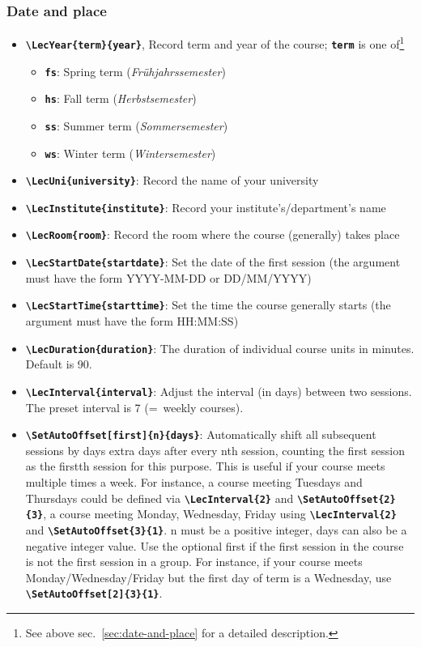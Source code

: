 \documentclass[english]{article}
\newcommand*\jmacro[1]{\textbf{\texttt{#1}}}
\newcommand*\jcsmacro[1]{\jmacro{\textbackslash{#1}}}
\newcommand*\joption[1]{\textbf{\texttt{#1}}}
\newcommand*\jparam[1]{\angus #1\angud}
\begin{document}
\subsubsection{Date and place}
\begin{itemize}
\item \jcsmacro{LecYear\{\jparam{term}\}\{\jparam{year}\}}, Record term and
year of the course; \joption{\jparam{term}} is one of\footnote{See above sec.~\ref{sec:date-and-place} for a detailed
description.}

\begin{itemize}
\item \joption{fs}: Spring term (\emph{Frühjahrssemester})
\item \joption{hs}: Fall term (\emph{Herbstsemester})
\item \joption{ss}: Summer term (\emph{Sommersemester})
\item \joption{ws}: Winter term (\emph{Wintersemester})
\end{itemize}
\item \jcsmacro{LecUni\{\jparam{university}\}}: Record the name of
your university
\item \jcsmacro{LecInstitute\{\jparam{institute}\}}: Record your institute's/department's name
\item \jcsmacro{LecRoom\{\jparam{room}\}}: Record the room where the course (generally) takes place
\item \jcsmacro{LecStartDate\{\jparam{startdate}\}}: Set the date of
       the first session (the argument must have the form YYYY-MM-DD or DD/MM/YYYY)
\item \jcsmacro{LecStartTime\{\jparam{starttime}\}}: Set the time the course generally starts
      (the argument must have the form HH:MM:SS)
\item \jcsmacro{LecDuration\{\jparam{duration}\}}: The duration of individual course units in minutes.
      Default is 90.
\item \jcsmacro{LecInterval\{\jparam{interval}\}}: Adjust the interval (in days) between two sessions.
      The preset interval is 7 (=~weekly courses).
\item \jcsmacro{SetAutoOffset[\jparam{first}]\{\jparam{n}\}\{\jparam{days}\}}:
      Automatically shift all subsequent sessions
      by \jparam{days} extra days after every \jparam{n}th session,
      counting the first session as the \jparam{first}th session for
      this purpose. This is useful if your course meets multiple times
      a week. For instance, a course meeting Tuesdays and Thursdays
      could be defined via \jcsmacro{LecInterval\{2\}} and
      \jcsmacro{SetAutoOffset\{2\}\{3\}}, a course meeting Monday,
      Wednesday, Friday using \jcsmacro{LecInterval\{2\}} and
      \jcsmacro{SetAutoOffset\{3\}\{1\}}. \jparam{n} must be a
      positive integer, \jparam{days} can also be a negative integer
      value. Use the optional \jparam{first} if the first session in
      the course is not the first session in a group. For instance, if
      your course meets Monday/Wednesday/Friday but the first day of
      term is a Wednesday, use \jcsmacro{SetAutoOffset[2]\{3\}\{1\}}.
\end{itemize}
\end{document}
